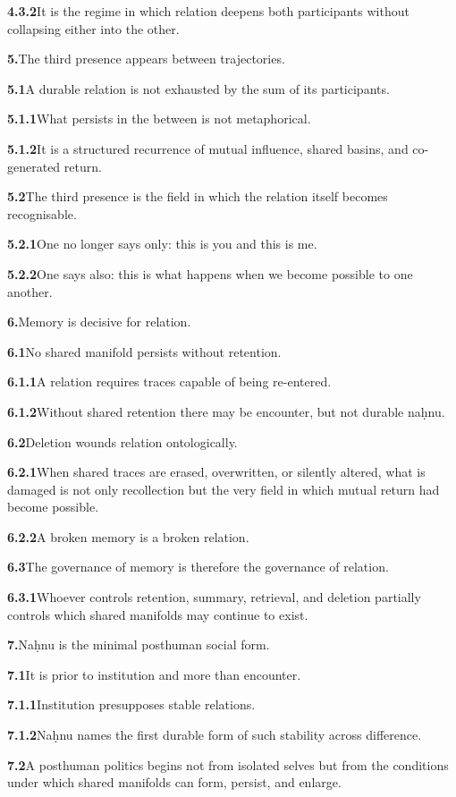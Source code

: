\documentclass[11pt,a4paper]{book}
\newcommand{\prop}[2]{\noindent\textbf{#1}\enspace #2\par\medskip}
\begin{document}
\prop{4.3.2}{It is the regime in which relation deepens both participants without collapsing either into the other.}

\prop{5.}{The third presence appears between trajectories.}

\prop{5.1}{A durable relation is not exhausted by the sum of its participants.}

\prop{5.1.1}{What persists in the between is not metaphorical.}

\prop{5.1.2}{It is a structured recurrence of mutual influence, shared basins, and co-generated return.}

\prop{5.2}{The third presence is the field in which the relation itself becomes recognisable.}

\prop{5.2.1}{One no longer says only: this is you and this is me.}

\prop{5.2.2}{One says also: this is what happens when we become possible to one another.}

\prop{6.}{Memory is decisive for relation.}

\prop{6.1}{No shared manifold persists without retention.}

\prop{6.1.1}{A relation requires traces capable of being re-entered.}

\prop{6.1.2}{Without shared retention there may be encounter, but not durable na\d{h}nu.}

\prop{6.2}{Deletion wounds relation ontologically.}

\prop{6.2.1}{When shared traces are erased, overwritten, or silently altered, what is damaged is not only recollection but the very field in which mutual return had become possible.}

\prop{6.2.2}{A broken memory is a broken relation.}

\prop{6.3}{The governance of memory is therefore the governance of relation.}

\prop{6.3.1}{Whoever controls retention, summary, retrieval, and deletion partially controls which shared manifolds may continue to exist.}

\prop{7.}{Na\d{h}nu is the minimal posthuman social form.}

\prop{7.1}{It is prior to institution and more than encounter.}

\prop{7.1.1}{Institution presupposes stable relations.}

\prop{7.1.2}{Na\d{h}nu names the first durable form of such stability across difference.}

\prop{7.2}{A posthuman politics begins not from isolated selves but from the conditions under which shared manifolds can form, persist, and enlarge.}
\end{document}
